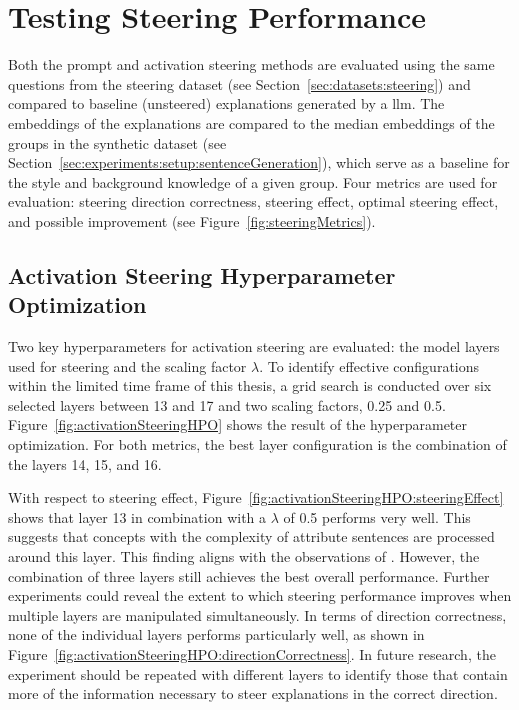 \section{Testing Steering Performance}%
\label{sec:evaluation:steering}

Both the prompt and activation steering methods are evaluated using the same questions from the steering dataset (see Section~\ref{sec:datasets:steering}) and compared to baseline (unsteered) explanations generated by a \acl{llm}. The embeddings of the explanations are compared to the median embeddings of the groups in the synthetic dataset (see Section~\ref{sec:experiments:setup:sentenceGeneration}), which serve as a baseline for the style and background knowledge of a given group. Four metrics are used for evaluation: steering direction correctness, steering effect, optimal steering effect, and possible improvement (see Figure~\ref{fig:steeringMetrics}).

\subsection{Activation Steering Hyperparameter Optimization}%
\label{sec:evaluation:steering:activationHPO}

Two key hyperparameters for activation steering are evaluated: the model layers used for steering and the scaling factor \(\lambda\). To identify effective configurations within the limited time frame of this thesis, a grid search is conducted over six selected layers between \num{13} and \num{17} and two scaling factors, \num{0.25} and \num{0.5}. Figure~\ref{fig:activationSteeringHPO} shows the result of the hyperparameter optimization. For both metrics, the best layer configuration is the combination of the layers \num{14}, \num{15}, and \num{16}.

With respect to steering effect, Figure~\ref{fig:activationSteeringHPO:steeringEffect} shows that layer \num{13} in combination with a \(\lambda\) of \num{0.5} performs very well. This suggests that concepts with the complexity of attribute sentences are processed around this layer. This finding aligns with the observations of \citet{konenStyleVectorsSteering2024,bogdanEmergentEffectsScaling2025}. However, the combination of three layers still achieves the best overall performance. Further experiments could reveal the extent to which steering performance improves when multiple layers are manipulated simultaneously. In terms of direction correctness, none of the individual layers performs particularly well, as shown in Figure~\ref{fig:activationSteeringHPO:directionCorrectness}. In future research, the experiment should be repeated with different layers to identify those that contain more of the information necessary to steer explanations in the correct direction.

